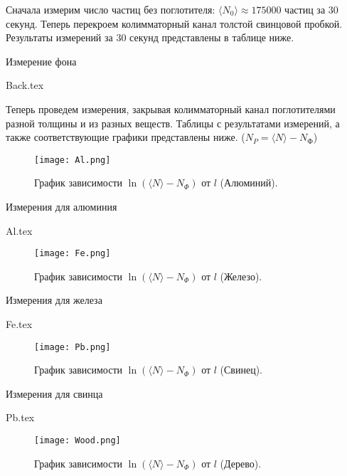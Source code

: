 Сначала измерим число частиц без поглотителя: $\langle N_0 \rangle \approx
175000$ частиц за $30$ секунд. Теперь перекроем колимматорный канал толстой
свинцовой пробкой. Результаты измерений за 30 секунд представлены в таблице
ниже.

\begin{table}[h!]
  \centering
  \caption{Измерение фона}
  {Back.tex}
\end{table}

Теперь проведем измерения, закрывая колимматорный канал поглотителями разной
толщины и из разных веществ. Таблицы с результатами измерений, а также
соответствующие графики представлены ниже. ($N_P = \langle N \rangle
-N_{\text{Ф}}$)
\newpage
\begin{figure}[h!]
  \texttt{[image: Al.png]}
  \caption{График зависимости $\ln{(\langle N \rangle-N_{\Phi})}$ от $l$
  (Алюминий).}
\end{figure}

\begin{table}[h!]
  \centering
  \caption{Измерения для алюминия}
  {Al.tex}
\end{table}

\newpage
\begin{figure}[h!]
  \texttt{[image: Fe.png]}
  \caption{График зависимости $\ln{(\langle N \rangle-N_{\Phi})}$ от $l$
  (Железо).}
\end{figure}

\begin{table}[h!]
  \centering
  \caption{Измерения для железа}
  {Fe.tex}
\end{table}

\newpage
\begin{figure}[h!]
  \texttt{[image: Pb.png]}
  \caption{График зависимости $\ln{(\langle N \rangle-N_{\Phi})}$ от $l$
  (Свинец).}
\end{figure}

\begin{table}[h!]
  \centering
  \caption{Измерения для свинца}
  {Pb.tex}
\end{table}

\newpage
\begin{figure}[h!]
  \texttt{[image: Wood.png]}
  \caption{График зависимости $\ln{(\langle N \rangle-N_{\Phi})}$ от $l$
  (Дерево).}
\end{figure}

